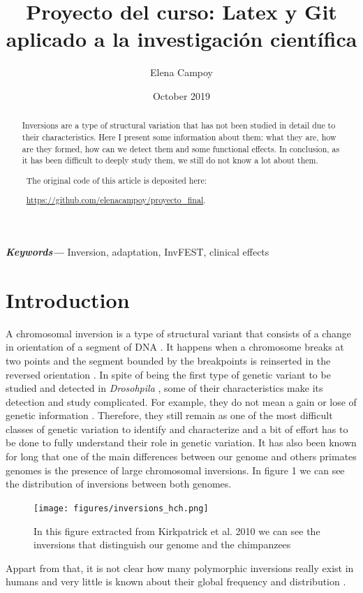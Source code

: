 \documentclass[a4paper,12pt]{article}
\title{Proyecto del curso: Latex y Git aplicado a la investigación científica}
\author{Elena Campoy}
\date{October 2019}
\providecommand{\keywords}[1]
{
  \small	
  \textbf{\textit{Keywords---}} #1
}
\begin{document}
\maketitle

\begin{abstract}
Inversions are a type of structural variation that has not been studied in detail due to their characteristics. Here I present some information about them: what they are, how are they formed, how can we detect them and some functional effects. In conclusion, as it has been difficult to deeply study them, we still do not know a lot about them. 

\
The original code of this article is deposited here:

\
\href{https://github.com/elenacampoy/proyecto_final}{https://github.com/elenacampoy/proyecto\_final}.
\end{abstract}

\keywords{Inversion, adaptation, InvFEST, clinical effects}

\section{Introduction}
A chromosomal inversion is a type of structural variant that consists of a change in orientation of a segment of DNA \cite{puig_human_2015, giner-delgado_evolutionary_2019}. It happens when a chromosome breaks at two points and the segment bounded by the breakpoints is reinserted in the reversed orientation \cite{kirkpatrick_how_2010}. In spite of being the first type of genetic variant to be studied and detected in {\em Drosohpila} \cite{kirkpatrick_how_2010}, some of their characteristics make its detection and study complicated. For example, they do not mean a gain or lose of genetic information \cite{giner-delgado_evolutionary_2019}. Therefore, they still remain as one of the most difficult classes of genetic variation to identify and characterize \cite{puig_determining_2019} and a bit of effort has to be done to fully understand their role in genetic variation. It has also been known for long that one of the main differences between our genome and others primates genomes is the presence of large chromosomal inversions. In figure 1 we can see the distribution of inversions between both genomes.
\begin{figure}[!htb]
    \centering
    \texttt{[image: figures/inversions\_hch.png]}
    \caption{In this figure extracted from Kirkpatrick et al. 2010 \cite{kirkpatrick_how_2010} we can see the inversions that distinguish our genome and the chimpanzees }
    \label{fig:invchimpanzees}
\end{figure}
Appart from that, it is not clear how many polymorphic inversions really exist in humans and very little is known about their global frequency and distribution \cite{giner-delgado_evolutionary_2019}.
\end{document}
